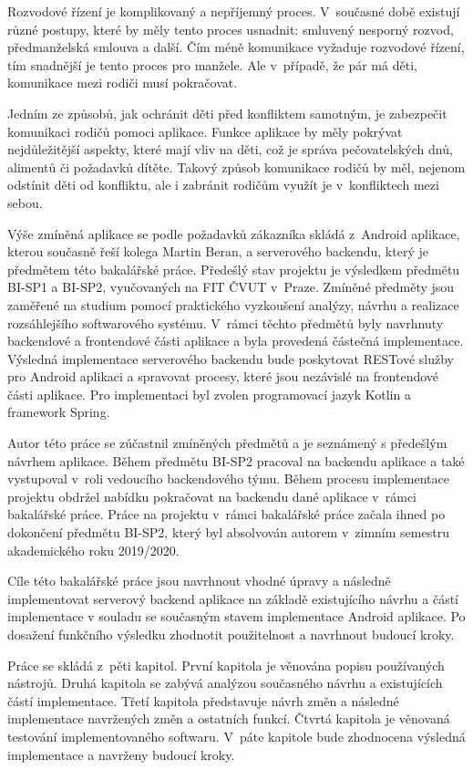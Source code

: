 
Rozvodové řízení je komplikovaný a nepříjemný proces. V~současné době existují různé postupy, které by měly tento proces usnadnit: smluvený nesporný rozvod, předmanželská smlouva a další. Čím méně komunikace vyžaduje rozvodové řízení, tím snadnější je tento proces pro manžele. Ale v~případě, že pár má děti, komunikace mezi rodiči musí pokračovat. 

Jedním ze způsobů, jak ochránit děti před konfliktem samotným, je zabezpečit komunikaci rodičů pomoci aplikace. Funkce aplikace by měly pokrývat nejdůležitější aspekty, které mají vliv na děti, což je správa pečovatelských dnů, alimentů či požadavků dítěte. Takový způsob komunikace rodičů by měl, nejenom odstínit děti od konfliktu, ale i zabránit rodičům využít je v~konfliktech mezi sebou.

Výše zmíněná aplikace se podle požadavků zákazníka skládá z~Android aplikace, kterou současně řeší kolega Martin Beran, a serverového backendu, který je předmětem této bakalářské práce. Předešlý stav projektu je výsledkem předmětu BI-SP1 a BI-SP2, vyučovaných na FIT ČVUT v~Praze. Zmíněné předměty jsou zaměřené na studium pomocí praktického vyzkoušení analýzy, návrhu a realizace rozsáhlejšího softwarového systému. V~rámci těchto předmětů byly navrhnuty backendové a frontendové části aplikace a byla provedená částečná implementace. 
Výsledná implementace serverového backendu bude poskytovat RESTové služby pro Android aplikaci a spravovat procesy, které jsou nezávislé na frontendové části aplikace. Pro implementaci byl zvolen programovací jazyk Kotlin a framework Spring. 

Autor této práce se zúčastnil zmíněných předmětů a je seznámený s předešlým návrhem aplikace. Během předmětu BI-SP2 pracoval na backendu aplikace a také vystupoval v~roli vedoucího backendového týmu. Během procesu implementace projektu obdržel nabídku pokračovat na backendu dané aplikace v~rámci bakalářské práce. Práce na projektu v~rámci bakalářské práce začala ihned po dokončení předmětu BI-SP2, který byl absolvován autorem v~zimním semestru akademického roku 2019/2020.

Cíle této bakalářské práce jsou navrhnout vhodné úpravy a následně implementovat serverový backend aplikace na základě existujícího návrhu a částí implementace v souladu se současným stavem implementace Android aplikace. Po dosažení funkčního výsledku zhodnotit použitelnost a navrhnout budoucí kroky.

Práce se skládá z~pěti kapitol. První kapitola je věnována popisu používaných nástrojů. Druhá kapitola se zabývá analýzou současného návrhu a existujících částí implementace. Třetí kapitola představuje návrh změn a následné implementace navržených změn a ostatních funkcí. Čtvrtá kapitola je věnovaná testování implementovaného softwaru. V~páte kapitole bude zhodnocena výsledná implementace a navrženy budoucí kroky.







